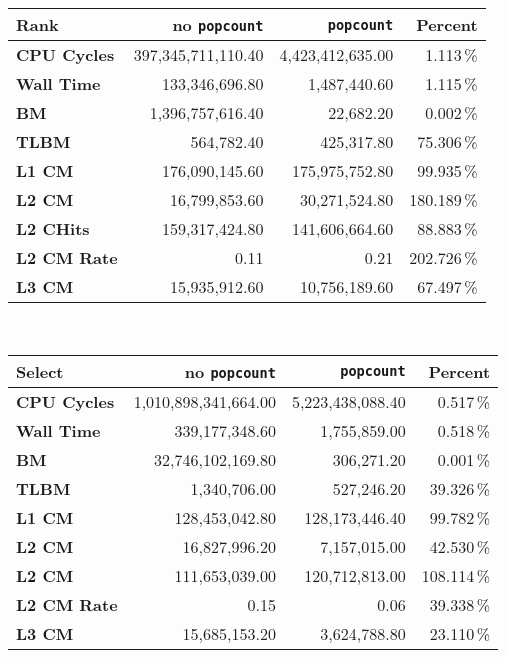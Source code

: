 \begin{tabular}{|lrrr|}
\hline
\textbf{Rank} & no \texttt{popcount} & \texttt{popcount} & Percent \\ \hline
\textbf{CPU Cycles} & 397,345,711,110.40 & 4,423,412,635.00 & 1.113\,\% \\ \hline
\textbf{Wall Time} & 133,346,696.80 & 1,487,440.60 & 1.115\,\% \\ \hline
\textbf{BM} & 1,396,757,616.40 & 22,682.20 & 0.002\,\% \\ \hline
\textbf{TLBM} & 564,782.40 & 425,317.80 & 75.306\,\% \\ \hline
\textbf{L1 CM} & 176,090,145.60 & 175,975,752.80 & 99.935\,\% \\ \hline
\textbf{L2 CM} & 16,799,853.60 & 30,271,524.80 & 180.189\,\% \\ \hline
\textbf{L2 CHits} & 159,317,424.80 & 141,606,664.60 & 88.883\,\% \\ \hline
\textbf{L2 CM Rate} & 0.11 & 0.21 & 202.726\,\% \\ \hline
\textbf{L3 CM} & 15,935,912.60 & 10,756,189.60 & 67.497\,\% \\ \hline
\end{tabular}\\[5pt]
\begin{tabular}{|lrrr|}
\hline
\textbf{Select} & no \texttt{popcount} & \texttt{popcount} & Percent \\ \hline
\textbf{CPU Cycles} & 1,010,898,341,664.00 & 5,223,438,088.40 & 0.517\,\% \\ \hline
\textbf{Wall Time} & 339,177,348.60 & 1,755,859.00 & 0.518\,\% \\ \hline
\textbf{BM} & 32,746,102,169.80 & 306,271.20 & 0.001\,\% \\ \hline
\textbf{TLBM} & 1,340,706.00 & 527,246.20 & 39.326\,\% \\ \hline
\textbf{L1 CM} & 128,453,042.80 & 128,173,446.40 & 99.782\,\% \\ \hline
\textbf{L2 CM} & 16,827,996.20 & 7,157,015.00 & 42.530\,\% \\ \hline
\textbf{L2 CM} & 111,653,039.00 & 120,712,813.00 & 108.114\,\% \\ \hline
\textbf{L2 CM Rate} & 0.15 & 0.06 & 39.338\,\% \\ \hline
\textbf{L3 CM} & 15,685,153.20 & 3,624,788.80 & 23.110\,\% \\ \hline
\end{tabular}\\[5pt]

